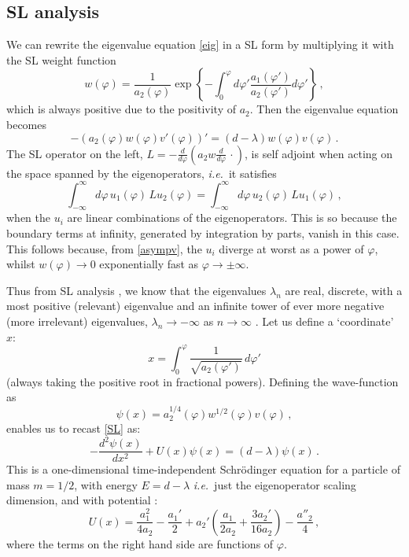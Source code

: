 \documentclass[11pt,a4paper]{article}
\numberwithin{figure}{section}
\numberwithin{equation}{section}
\newcommand{\be}{\begin{equation}}
\newcommand{\ee}{\end{equation}}
\newcommand\ie{\textit{i.e.}\ }
\newcommand{\ph}{\varphi}
\begin{document}
\subsection{SL analysis}

We can rewrite the eigenvalue equation \eqref{eig} in a SL form by multiplying it with the SL weight function
\begin{equation} \label{weight}
    w(\ph)=\frac{1}{a_2(\ph)}\exp \left\{-\int_0^\ph d\ph' \frac{a_1(\ph')}{a_2(\ph')} d\ph' \right\} \,,
\end{equation}
which is always positive due to the positivity of $a_2$. Then the eigenvalue equation becomes
\begin{equation}
    -\left(a_2(\ph)w(\ph)v'(\ph) \right)'=(d-\lambda) w(\ph)v(\ph)\,. \label{SL}
\end{equation}
The SL operator on the left, $L=-\frac{d}{d\ph}\left( a_2 w \frac{d}{d\ph}\,\cdot \right)$, is self adjoint when acting on the space spanned by the eigenoperators, \ie it satisfies
\be \int^\infty_{-\infty}\!\!\!\!\!d\ph\, u_1(\ph)\, L u_2(\ph) = \int^\infty_{-\infty}\!\!\!\!\!d\ph\, u_2(\ph)\, L u_1(\ph)\,,\ee  
when the $u_i$ are linear combinations of the eigenoperators. This is so because the boundary terms at infinity, generated by integration by parts, vanish in this case. This follows because, from \eqref{asympv}, the $u_i$ diverge at worst as a power of $\ph$, whilst $w(\ph) \rightarrow 0$ exponentially fast as $\ph\rightarrow \pm \infty$. 

Thus from SL analysis \cite{Ince1956}, we know that the eigenvalues $\lambda_n$ are real, discrete, with a most positive (relevant) eigenvalue and an infinite tower of ever more negative (more irrelevant) eigenvalues, $\lambda_n\to-\infty$ as $n\to\infty$ \cite{Morris:1996xq}. Let us define a `coordinate' $x$:
\begin{equation}
    x = \int_0^\ph \frac{1}{\sqrt{a_2(\ph')}}\, d \ph' \label{x}
\end{equation}
(always taking the positive root in fractional powers).
Defining the wave-function as
\begin{equation}
\label{psi}
    \psi(x) = a_2^{1/4}(\ph)w^{1/2}(\ph)v(\ph)\,,
\end{equation}
enables us to recast \eqref{SL} as:
\begin{equation}
    -\frac{d^2\psi(x)}{dx^2}+U(x)\psi(x)=(d-\lambda)\psi(x) \,. \label{shrod}
\end{equation}
This is a one-dimensional time-independent Schrödinger equation for a particle of mass $m=1/2$, with energy $E=d-\lambda$ \ie just the eigenoperator scaling dimension, and with potential \cite{Benedetti:2013jk,Mitchell:2021qjr,Morris:2022btf}:
\begin{equation}
    U(x)=\frac{a_1^2}{4a_2}-\frac{a_1'}{2}+a_2'\left(\frac{a_1}{2a_2}+\frac{3a_2'}{16a_2}\right)-\frac{a''_2}{4}\,, \label{Ux}
\end{equation}
where the terms on the right hand side are functions of $\ph$. 
\end{document}
